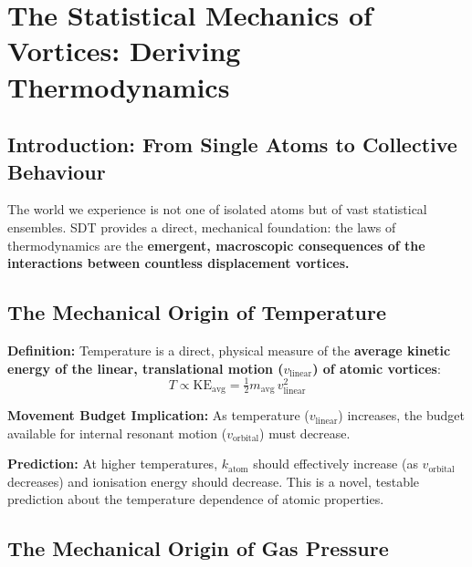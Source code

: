 \chapter{The Statistical Mechanics of Vortices: Deriving Thermodynamics}


\section{Introduction: From Single Atoms to Collective Behaviour}

The world we experience is not one of isolated atoms but of vast statistical ensembles.  SDT provides a direct, mechanical foundation: the laws of thermodynamics are the \textbf{emergent, macroscopic consequences of the interactions between countless displacement vortices.}


\section{The Mechanical Origin of Temperature}

\textbf{Definition:} Temperature is a direct, physical measure of the \textbf{average kinetic energy of the linear, translational motion ($v_{\text{linear}}$) of atomic vortices}:
\begin{equation}\label{eq:temp}
  T \propto \text{KE}_{\text{avg}} = \tfrac{1}{2}m_{\text{avg}}\,v_{\text{linear}}^2
\end{equation}

\textbf{Movement Budget Implication:} As temperature ($v_{\text{linear}}$) increases, the budget available for internal resonant motion ($v_{\text{orbital}}$) must decrease.

\textbf{Prediction:} At higher temperatures, $k_{\text{atom}}$ should effectively increase (as $v_{\text{orbital}}$ decreases) and ionisation energy should decrease.  This is a novel, testable prediction about the temperature dependence of atomic properties.


\section{The Mechanical Origin of Gas Pressure}

